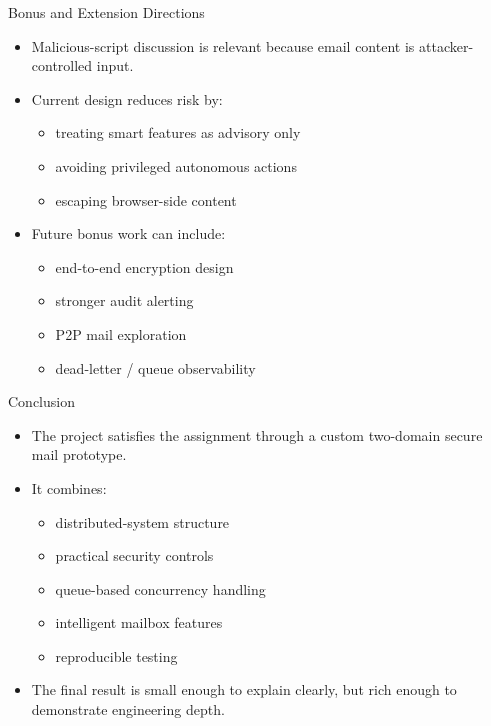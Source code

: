 \documentclass[aspectratio=169]{beamer}
\begin{document}
\begin{frame}{Bonus and Extension Directions}
  \begin{itemize}
    \item Malicious-script discussion is relevant because email content is attacker-controlled input.
    \item Current design reduces risk by:
    \begin{itemize}
      \item treating smart features as advisory only
      \item avoiding privileged autonomous actions
      \item escaping browser-side content
    \end{itemize}
    \item Future bonus work can include:
    \begin{itemize}
      \item end-to-end encryption design
      \item stronger audit alerting
      \item P2P mail exploration
      \item dead-letter / queue observability
    \end{itemize}
  \end{itemize}
\end{frame}

\begin{frame}{Conclusion}
  \begin{itemize}
    \item The project satisfies the assignment through a custom two-domain secure mail prototype.
    \item It combines:
    \begin{itemize}
      \item distributed-system structure
      \item practical security controls
      \item queue-based concurrency handling
      \item intelligent mailbox features
      \item reproducible testing
    \end{itemize}
    \item The final result is small enough to explain clearly, but rich enough to demonstrate engineering depth.
  \end{itemize}
\end{frame}
\end{document}
